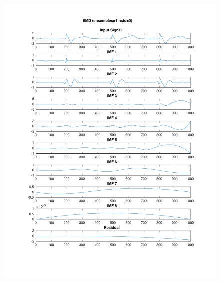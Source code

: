 \documentclass[11pt,a4paper]{article}
\begin{document}
\begin{figure}[H]
\centering
\begin{minipage}{0.48\textwidth}
	\centering
	\includegraphics[width=\textwidth]{fig/217l1_emd.pdf}
\end{minipage}
\begin{minipage}{0.48\textwidth}
	\centering

\end{minipage}
\end{figure}
\end{document}
